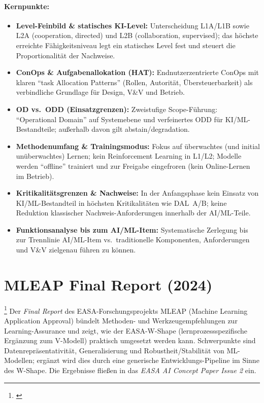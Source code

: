 \paragraph{Kernpunkte:}
\begin{itemize}
  \item \textbf{Level-Feinbild \& statisches KI-Level:} Unterscheidung L1A/L1B sowie L2A (cooperation, directed) und L2B (collaboration, supervised); das höchste erreichte Fähigkeitsniveau legt ein statisches Level fest und steuert die Proportionalität der Nachweise.
  \item \textbf{ConOps \& Aufgabenallokation (HAT):} Endnutzerzentrierte ConOps mit klaren ``task Allocation Patterns'' (Rollen, Autorität, Übersteuerbarkeit) als verbindliche Grundlage für Design, V\&V und Betrieb.
  \item \textbf{OD vs.\ ODD (Einsatzgrenzen):} Zweistufige Scope-Führung: ``Operational Domain'' auf Systemebene und verfeinertes ODD für KI/ML-Bestandteile; außerhalb davon gilt abstain/degradation.
  \item \textbf{Methodenumfang \& Trainingsmodus:} Fokus auf überwachtes (und initial unüberwachtes) Lernen; kein Reinforcement Learning in L1/L2; Modelle werden ``offline'' trainiert und zur Freigabe eingefroren (kein Online-Lernen im Betrieb).
  \item \textbf{Kritikalitätsgrenzen \& Nachweise:} In der Anfangsphase kein Einsatz von KI/ML-Bestandteil in höchsten Kritikalitäten wie DAL~A/B; keine Reduktion klassischer Nachweis-Anforderungen innerhalb der AI/ML-Teile.
  \item \textbf{Funktionsanalyse bis zum AI/ML-Item:} Systematische Zerlegung bis zur Trennlinie AI/ML-Item vs.\ traditionelle Komponenten, Anforderungen und V\&V zielgenau führen zu können.
\end{itemize}




\section{MLEAP Final Report (2024)} \footnote{ \parencite{easa-mleap-final-2024}}
Der \emph{Final Report} des EASA-Forschungsprojekts MLEAP (Machine Learning Application Approval) bündelt Methoden- und 
Werkzeugempfehlungen zur Learning-Assurance und zeigt, wie der EASA-W-Shape (lernprozessspezifische Ergänzung zum V-Modell) 
praktisch umgesetzt werden kann. Schwerpunkte sind Datenrepräsentativität, Generalisierung und Robustheit/Stabilität 
von ML-Modellen; ergänzt wird dies durch eine generische Entwicklungs-Pipeline im Sinne des W-Shape. Die Ergebnisse fließen 
in das \emph{EASA AI Concept Paper Issue 2} ein.

